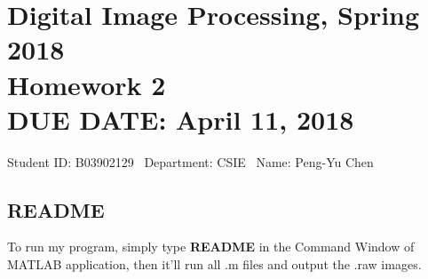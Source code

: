\documentclass{article}
\newcommand{\hmwkClass}{Digital Image Processing, Spring 2018}
\newcommand{\hmwkTitle}{Homework 2}
\newcommand{\hmwkDueDate}{April 11, 2018}
\newcommand{\tb}{\textbf}
\begin{document}
\thispagestyle{empty}
\section*{\hmwkClass \\
    \normalsize{\hmwkTitle} \\
    \normalsize{DUE DATE: \hmwkDueDate}
}

\hfill{Student ID: B03902129 \, Department: CSIE \, Name: Peng-Yu Chen}


\subsection*{README}

To run my program, simply type \tb{README} in the Command Window of MATLAB application, then it'll run all .m files and output the .raw images.
\end{document}

